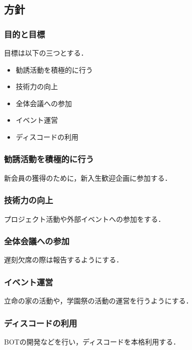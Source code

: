 \subsection*{\newGradeIfKouki{}\thirdGrade{}方針}



\subsubsection*{目的と目標}

目標は以下の三つとする．

\begin{itemize}
\item 勧誘活動を積極的に行う
\item 技術力の向上
\item 全体会議への参加
\item イベント運営
\item ディスコードの利用
\end{itemize}

\subsubsection*{勧誘活動を積極的に行う}
新会員の獲得のために，新入生歓迎企画に参加する．

\subsubsection*{技術力の向上}
プロジェクト活動や外部イベントへの参加をする．

\subsubsection*{全体会議への参加}
遅刻欠席の際は報告するようにする．

\subsubsection*{イベント運営}
立命の家の活動や，学園祭の活動の運営を行うようにする．

\subsubsection*{ディスコードの利用}
BOTの開発などを行い，ディスコードを本格利用する．